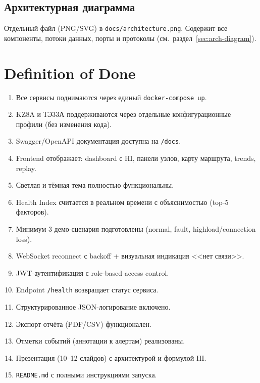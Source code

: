\documentclass[12pt,a4paper]{article}
\newcommand{\code}[1]{\texttt{#1}}
\begin{document}
\subsection{Архитектурная диаграмма}

Отдельный файл (PNG/SVG) в \code{docs/architecture.png}. Содержит все компоненты, потоки данных, порты и протоколы (см.~раздел~\ref{sec:arch-diagram}).


\section{Definition of Done}

\begin{enumerate}[nosep]
  \item Все сервисы поднимаются через единый \code{docker-compose up}.
  \item KZ8A и ТЭ33А поддерживаются через отдельные конфигурационные профили (без изменения кода).
  \item Swagger/OpenAPI документация доступна на \code{/docs}.
  \item Frontend отображает: dashboard с HI, панели узлов, карту маршрута, trends, replay.
  \item Светлая и тёмная тема полностью функциональны.
  \item Health Index считается в реальном времени с объяснимостью (top-5 факторов).
  \item Минимум 3 демо-сценария подготовлены (normal, fault, highload/connection loss).
  \item WebSocket reconnect с backoff + визуальная индикация <<нет связи>>.
  \item JWT-аутентификация с role-based access control.
  \item Endpoint \code{/health} возвращает статус сервиса.
  \item Структурированное JSON-логирование включено.
  \item Экспорт отчёта (PDF/CSV) функционален.
  \item Отметки событий (аннотации к алертам) реализованы.
  \item Презентация (10--12 слайдов) с архитектурой и формулой HI.
  \item \code{README.md} с полными инструкциями запуска.
\end{enumerate}
\end{document}
